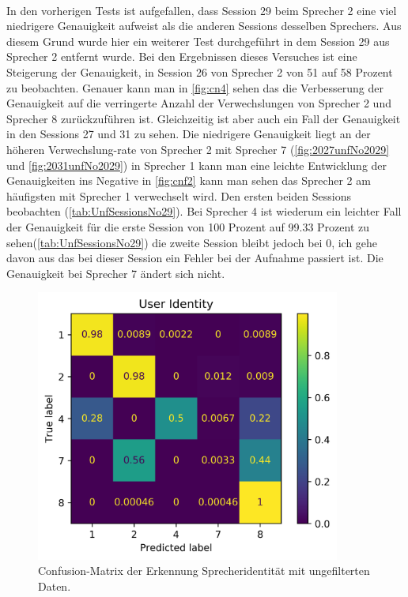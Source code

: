 \paragraph{}
In den vorherigen Tests ist aufgefallen, dass Session 29 beim Sprecher 2 eine viel niedrigere Genauigkeit aufweist als die anderen Sessions desselben Sprechers. Aus diesem Grund wurde hier ein weiterer Test durchgeführt in dem Session 29 aus Sprecher 2 entfernt wurde. Bei den Ergebnissen dieses Versuches ist eine Steigerung der Genauigkeit, in Session 26 von Sprecher 2 von 51 auf 58 Prozent zu beobachten. Genauer kann man in \ref{fig:cn4} sehen das die Verbesserung der Genauigkeit auf die verringerte Anzahl der Verwechslungen von Sprecher 2 und Sprecher 8 zurückzuführen ist. Gleichzeitig ist aber auch ein Fall der Genauigkeit in den Sessions 27 und 31 zu sehen. Die niedrigere Genauigkeit liegt an der höheren Verwechslung-rate von Sprecher 2 mit Sprecher 7 (\ref{fig:2027unfNo2029} und \ref{fig:2031unfNo2029}) in Sprecher 1 kann man eine leichte Entwicklung der Genauigkeiten ins Negative in \ref{fig:cnf2} kann man sehen das Sprecher 2 am häufigsten mit Sprecher 1 verwechselt wird. Den ersten beiden Sessions beobachten (\ref{tab:UnfSessionsNo29}). Bei Sprecher 4 ist wiederum ein leichter Fall der Genauigkeit für die erste Session von 100 Prozent auf 99.33 Prozent zu sehen(\ref{tab:UnfSessionsNo29}) die zweite Session bleibt jedoch bei 0, ich gehe davon aus das bei dieser Session ein Fehler bei der Aufnahme passiert ist. Die Genauigkeit bei Sprecher 7 ändert sich nicht.

\begin{figure}[H]
  \centering
  \includegraphics[width=100mm ,scale=0.6]{AllUserConfMatUnf_without29.png}
  \caption{Confusion-Matrix der Erkennung Sprecheridentität mit ungefilterten Daten.}
  \label{fig:Usercnf1_without29}
\end{figure}

